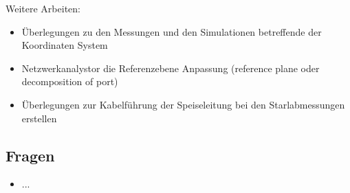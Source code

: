 \documentclass[10pt,a4paper]{article}
\begin{document}
Weitere Arbeiten:
\begin{itemize}
\item Überlegungen zu den Messungen und den Simulationen betreffende der Koordinaten System
	\item Netzwerkanalystor die Referenzebene Anpassung (reference plane oder decomposition of port)
	\item Überlegungen zur Kabelführung der Speiseleitung bei den Starlabmessungen erstellen
\end{itemize}
\subsection*{Fragen}
\begin{itemize}
	\item ...
\end{itemize}
\end{document}
